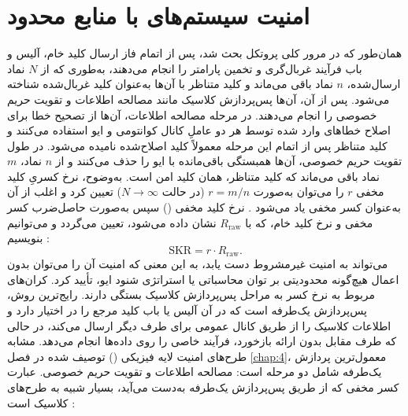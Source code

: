 \section{امنیت سیستم‌های  با منابع محدود}
\label{sec:8-2}

همان‌طور که در مرور کلی پروتکل  بحث شد، پس از اتمام فاز ارسال کلید خام، آلیس و باب فرآیند غربال‌گری و تخمین پارامتر را انجام می‌دهند، به‌طوری که از $N$ نماد ارسال‌شده، $n$ نماد باقی می‌ماند و کلید متناظر با آن‌ها به‌عنوان کلید غربال‌شده شناخته می‌شود. پس از آن، آن‌ها پس‌پردازش کلاسیک مانند مصالحه اطلاعات و تقویت حریم خصوصی را انجام می‌دهند. در مرحله مصالحه اطلاعات، آن‌ها از تصحیح خطا برای اصلاح خطاهای وارد شده توسط هر دو عاملِ کانال کوانتومی و ایو استفاده می‌کنند و کلید متناظر پس از اتمام این مرحله معمولاً کلید اصلاح‌شده نامیده می‌شود. در طول تقویت حریم خصوصی، آن‌ها همبستگی باقی‌مانده با ایو را حذف می‌کنند و از $n$ نماد، $m$ نماد باقی می‌ماند که کلید متناظر، همان کلید امن است. به‌وضوح، نرخ کسریِ کلید مخفی $r$ را می‌توان به‌صورت $r = m/n$ (در حالت $N \to \infty$) تعیین کرد و اغلب از آن به‌عنوان کسر مخفی یاد می‌شود \cite{8-8}. نرخ کلید مخفی () سپس به‌صورت حاصل‌ضرب کسر مخفی و نرخ کلید خام، که با $R_{\text{raw}}$ نشان داده می‌شود، تعیین می‌گردد و می‌توانیم بنویسیم \cite{8-8}:
\begin{equation}
	\text{SKR} = r \cdot R_{\text{raw}}.
	\label{eq:8-17}
\end{equation}
 می‌تواند به امنیت غیرمشروط دست یابد، به این معنی که امنیت آن را می‌توان بدون اعمال هیچ‌گونه محدودیتی بر توان محاسباتی یا استراتژی شنود ایو، تأیید کرد. کران‌های مربوط به نرخ کسر به مراحل پس‌پردازش کلاسیک بستگی دارند. رایج‌ترین روش، پس‌پردازش یک‌طرفه است که در آن آلیس یا باب کلید مرجع را در اختیار دارد و اطلاعات کلاسیک را از طریق کانال عمومی برای طرف دیگر ارسال می‌کند، در حالی که طرف مقابل بدون ارائه بازخورد، فرآیند خاصی را روی داده‌ها انجام می‌دهد. مشابه طرح‌های امنیت لایه فیزیکی () توصیف شده در فصل \ref{chap:4}، معمول‌ترین پردازش یک‌طرفه شامل دو مرحله است: مصالحه اطلاعات و تقویت حریم خصوصی. عبارت کسر مخفی که از طریق پس‌پردازش یک‌طرفه به‌دست می‌آید، بسیار شبیه به طرح‌های  کلاسیک است \cite{8-8}:
